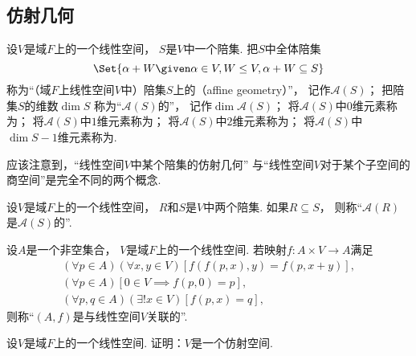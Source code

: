 \subsection{仿射几何}
\begin{definition}
设\(V\)是域\(F\)上的一个线性空间，
\(S\)是\(V\)中一个陪集.
把\(S\)中全体陪集\begin{equation*}
	\Set{
		\alpha + W
		\given
		\alpha \in V,
		W \AlgebraSubstructure V,
		\alpha + W \subseteq S
	}
\end{equation*}
称为“（域\(F\)上线性空间\(V\)中）陪集\(S\)上的（affine geometry）”，
记作\(\mathcal{A}(S)\)；
把陪集\(S\)的维数\(\dim S\)
称为“\(\mathcal{A}(S)\)的”，
记作\(\dim\mathcal{A}(S)\)；
将\(\mathcal{A}(S)\)中\(0\)维元素称为；
将\(\mathcal{A}(S)\)中\(1\)维元素称为；
将\(\mathcal{A}(S)\)中\(2\)维元素称为；
将\(\mathcal{A}(S)\)中\(\dim S-1\)维元素称为.
\end{definition}
\begin{remark}
应该注意到，“线性空间\(V\)中某个陪集的仿射几何”
与“线性空间\(V\)对于某个子空间的商空间”是完全不同的两个概念.
\end{remark}

\begin{definition}
设\(V\)是域\(F\)上的一个线性空间，
\(R\)和\(S\)是\(V\)中两个陪集.
如果\(R \subseteq S\)，
则称“\(\mathcal{A}(R)\)是\(\mathcal{A}(S)\)的”.
\end{definition}

\begin{definition}
设\(A\)是一个非空集合，
\(V\)是域\(F\)上的一个线性空间.
若映射\(f\colon A \times V \to A\)满足\begin{gather*}
	(\forall p \in A)
	(\forall x,y \in V)
	[
		f(f(p,x),y)
		= f(p,x+y)
	], \\
	(\forall p \in A)
	[
		0 \in V
		\implies
		f(p,0) = p
	], \\
	(\forall p,q \in A)
	(\exists! x \in V)
	[
		f(p,x) = q
	],
\end{gather*}
则称“\((A,f)\)是与线性空间\(V\)关联的”.
\end{definition}

\begin{example}
设\(V\)是域\(F\)上的一个线性空间.
证明：\(V\)是一个仿射空间.
\end{example}

